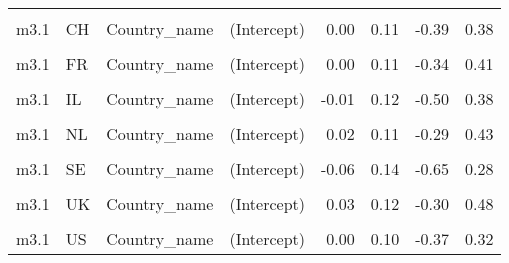 \begin{table}
\begin{tabular}[t]{llllrrrr}
\cellcolor{gray!10}{m3.1} & \cellcolor{gray!10}{CA} & \cellcolor{gray!10}{Country\_name} & \cellcolor{gray!10}{EPS} & \cellcolor{gray!10}{-0.06} & \cellcolor{gray!10}{0.06} & \cellcolor{gray!10}{-0.20} & \cellcolor{gray!10}{0.08}\\
m3.1 & CH & Country\_name & (Intercept) & 0.00 & 0.11 & -0.39 & 0.38\\
\cellcolor{gray!10}{m3.1} & \cellcolor{gray!10}{CH} & \cellcolor{gray!10}{Country\_name} & \cellcolor{gray!10}{EPS} & \cellcolor{gray!10}{-0.01} & \cellcolor{gray!10}{0.05} & \cellcolor{gray!10}{-0.15} & \cellcolor{gray!10}{0.12}\\
m3.1 & FR & Country\_name & (Intercept) & 0.00 & 0.11 & -0.34 & 0.41\\
\cellcolor{gray!10}{m3.1} & \cellcolor{gray!10}{FR} & \cellcolor{gray!10}{Country\_name} & \cellcolor{gray!10}{EPS} & \cellcolor{gray!10}{0.00} & \cellcolor{gray!10}{0.05} & \cellcolor{gray!10}{-0.12} & \cellcolor{gray!10}{0.14}\\
m3.1 & IL & Country\_name & (Intercept) & -0.01 & 0.12 & -0.50 & 0.38\\
\cellcolor{gray!10}{m3.1} & \cellcolor{gray!10}{IL} & \cellcolor{gray!10}{Country\_name} & \cellcolor{gray!10}{EPS} & \cellcolor{gray!10}{0.00} & \cellcolor{gray!10}{0.10} & \cellcolor{gray!10}{-0.24} & \cellcolor{gray!10}{0.23}\\
m3.1 & NL & Country\_name & (Intercept) & 0.02 & 0.11 & -0.29 & 0.43\\
\cellcolor{gray!10}{m3.1} & \cellcolor{gray!10}{NL} & \cellcolor{gray!10}{Country\_name} & \cellcolor{gray!10}{EPS} & \cellcolor{gray!10}{0.03} & \cellcolor{gray!10}{0.05} & \cellcolor{gray!10}{-0.10} & \cellcolor{gray!10}{0.17}\\
m3.1 & SE & Country\_name & (Intercept) & -0.06 & 0.14 & -0.65 & 0.28\\
\cellcolor{gray!10}{m3.1} & \cellcolor{gray!10}{SE} & \cellcolor{gray!10}{Country\_name} & \cellcolor{gray!10}{EPS} & \cellcolor{gray!10}{-0.13} & \cellcolor{gray!10}{0.07} & \cellcolor{gray!10}{-0.28} & \cellcolor{gray!10}{0.02}\\
m3.1 & UK & Country\_name & (Intercept) & 0.03 & 0.12 & -0.30 & 0.48\\
\cellcolor{gray!10}{m3.1} & \cellcolor{gray!10}{UK} & \cellcolor{gray!10}{Country\_name} & \cellcolor{gray!10}{EPS} & \cellcolor{gray!10}{0.05} & \cellcolor{gray!10}{0.06} & \cellcolor{gray!10}{-0.07} & \cellcolor{gray!10}{0.19}\\
m3.1 & US & Country\_name & (Intercept) & 0.00 & 0.10 & -0.37 & 0.32\\

\end{tabular}
\end{table}
